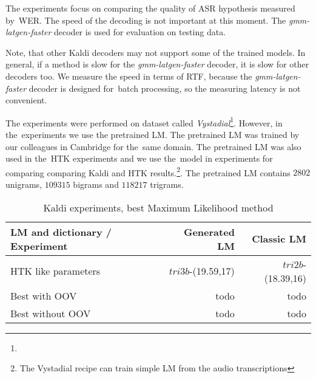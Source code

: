 The experiments focus on comparing the quality of ASR hypothesis measured by~\ac{WER}.
The speed of the decoding is not important at this moment.  The {\it gmm-latgen-faster}\/ decoder is used for evaluation on testing data. 

Note, that other Kaldi decoders may not support some of the trained models.
In general, if a method is slow for the {\it gmm-latgen-faster}\/ decoder, it is slow for other decoders too.
We measure the speed in terms of \ac{RTF}, because the {\it gmm-latgen-faster}\/ decoder is designed for~batch 
processing, so the measuring latency is not convenient.


The experiments were performed on dataset called {\it Vystadial}\footnote{}.
However, in the~experiments we use the pretrained \ac{LM}.
The pretrained \acl{LM} was trained by our colleagues in Cambridge for the~same domain.
The pretrained \ac{LM} was also used in the~\ac{HTK} experiments and we use the~model in experiments 
for comparing comparing Kaldi and \ac{HTK} results.\footnote{The Vystadial recipe can train simple \ac{LM} from the audio transcriptions}.
The pretrained \ac{LM} contains $2802$ unigrams, $109315$ bigrams and
$118217$ trigrams. 


\begin{table}[!htp]\label{tab:exp_best}
\begin{tabular}{lrr}
\hline
\parbox[t]{6.0cm}{\ac{LM} and dictionary / Experiment} & Generated \acs{LM}  & Classic \ac{LM} \\
\hline
\ac{HTK} like parameters    &  $tri3b$-(19.59,17) & $tri2b$-(18.39,16) \\
Best with OOV               & todo & todo \\
Best without OOV            & todo & todo \\
\hline
\end{tabular}
\caption{Kaldi experiments, best Maximum Likelihood method}
\end{table}


